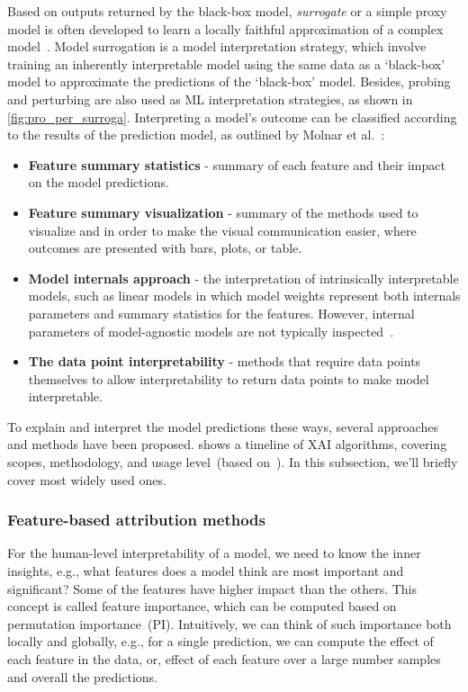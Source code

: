\hspace*{3.5mm} Based on outputs returned by the black-box model, \textit{surrogate} or a simple proxy model is often developed to learn a locally faithful approximation of a complex model~\cite{stiglic2020interpretability}. Model surrogation is a model interpretation strategy, which involve training an inherently interpretable model using the same data as a `black-box' model to approximate the predictions of the `black-box' model. Besides, probing and perturbing are also used as ML interpretation strategies, as shown in \cref{fig:pro_per_surroga}. Interpreting a model's outcome can be classified according to the results of the prediction model, as outlined by Molnar et al.~\cite{molnar2019interpretable}:

\vspace{-2mm}
\begin{itemize}[noitemsep]
    \item \textbf{Feature summary statistics} - summary of each feature and their impact on the model predictions. 
    \item \textbf{Feature summary visualization} - summary of the methods used to visualize and in order to make the visual communication easier, where outcomes are  presented with bars, plots, or table. 
    \item \textbf{Model internals approach} - the interpretation of intrinsically interpretable models, such as linear models in which model weights represent both internals parameters and summary statistics for the features. However, internal parameters of model-agnostic models are not typically inspected~\cite{molnar2019interpretable}. 
    \item \textbf{The data point interpretability} - methods that require data points themselves to allow interpretability to  return data points to make model interpretable. 
\end{itemize}

\hspace*{3.5mm} To explain and interpret the model predictions these ways, several approaches and methods have been proposed. 
 shows a timeline of XAI algorithms, covering scopes, methodology, and usage level~(based on~\cite{das2020opportunities}). In this subsection, we'll briefly cover most widely used ones. 

\subsubsection{Feature-based attribution methods}
\label{subsubsec:FI_shap}
For the human-level interpretability of a model, we need to know the inner insights, e.g., what features does a model think are most important and significant? Some of the features have higher impact than the others. This concept is called feature importance, which can be computed based on permutation importance~(PI). Intuitively, we can think of such importance both locally and globally, e.g., for a single prediction, we can compute the effect of each feature in the data, or, effect of each feature over a large number samples and overall the predictions.

